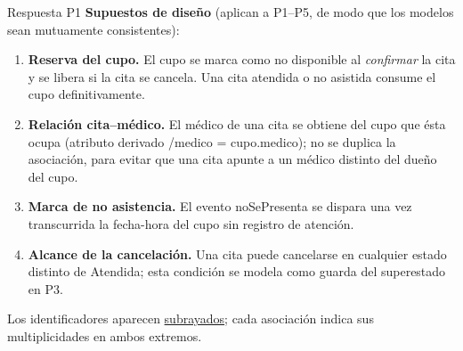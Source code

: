 \documentclass[11pt,a4paper,oneside]{article}
\begin{document}
\begin{respuesta}{Respuesta P1}
\textbf{Supuestos de dise\~no} (aplican a P1--P5, de modo que los modelos sean mutuamente
consistentes):

\begin{enumerate}[leftmargin=1.4em,itemsep=1pt,topsep=2pt]
\item \textbf{Reserva del cupo.} El cupo se marca como no disponible al \emph{confirmar} la cita y se
libera si la cita se cancela. Una cita atendida o no asistida consume el cupo definitivamente.
\item \textbf{Relaci\'on cita--m\'edico.} El m\'edico de una cita se obtiene del cupo que \'esta ocupa
(atributo derivado \textsf{/medico = cupo.medico}); no se duplica la asociaci\'on, para evitar que una
cita apunte a un m\'edico distinto del due\~no del cupo.
\item \textbf{Marca de no asistencia.} El evento \textsf{noSePresenta} se dispara una vez transcurrida
la fecha-hora del cupo sin registro de atenci\'on.
\item \textbf{Alcance de la cancelaci\'on.} Una cita puede cancelarse en cualquier estado distinto de
\textsf{Atendida}; esta condici\'on se modela como guarda del superestado en P3.
\end{enumerate}

Los identificadores aparecen \underline{subrayados}; cada asociaci\'on indica sus multiplicidades en
ambos extremos.

\begin{center}
\setlength{\fboxsep}{8pt}\colorbox{white}{%
}
\end{center}
\end{respuesta}
\end{document}

